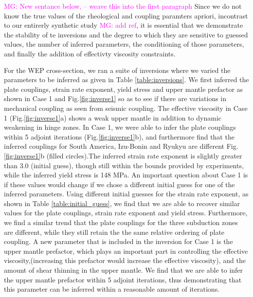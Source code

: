 \documentclass[12pt]{article}
\newcommand{\mgnote}[1]{\textcolor{magenta}{MG: #1}}
\begin{document}

\mgnote{New sentance below, -- weave this into the first paragraph}
Since we do not know the true values of the rheological and coupling 
paramters apriori, incontrast to our entirerly synthetic study \mgnote{add ref}, it is essential that we demonstrate the stability of te inversions and
the degree to which they are sensitive to guessed values, the number of
inferred parameters, the conditioning of those parameters, and 
finally the addition of effectivty viscosity constraints.

For the WEP cross-section, we ran a suite of inversions where we varied the parameters to be inferred as given in Table \ref{table:inversions}.  We first inferred the plate couplings, strain rate exponent, yield stress and upper mantle prefactor as shown in Case 1 and Fig.\ref{fig:inverse1} so as to see if there are variations in mechanical coupling as seen from seismic coupling. The effective viscosity in Case 1 (Fig.\ref{fig:inverse1}a) shows a weak upper mantle in addition to dynamic weakening in hinge zones.  In Case 1, we were able to infer the plate couplings within 5 adjoint iterations (Fig.\ref{fig:inverse1}b), and furthermore find that the inferred couplings for South America, Izu-Bonin and Ryukyu are different Fig.\ref{fig:inverse1}b (filled circles).The inferred strain rate exponent is slightly greater than 3.0 (initial guess), though still within the bounds provided by experiments, while the inferred yield stress is 148 MPa. An important question about Case 1 is if these values would change if we chose a different initial guess for one of the inferred parameters. Using different initial guesses for the strain rate exponent, as shown in Table \ref{table:initial_guess}, we find that we are able to recover similar values for the plate couplings, strain rate exponent and yield stress. Furthermore, we find a similar trend that the plate couplings for the three subduction zones are different, while they still retain the the same relative ordering of plate coupling.   
A new parameter that is included in the inversion for Case 1 is the upper mantle prefactor, which plays an important part in controlling the effective viscosity,(increasing this prefactor would increase the effective viscosity), and the amount of shear thinning in the upper mantle. We find that we are able to infer the upper mantle prefactor within 5 adjoint iterations, thus demonstrating that this parameter can be inferred within a reasonable amount of iterations.
\end{document}
